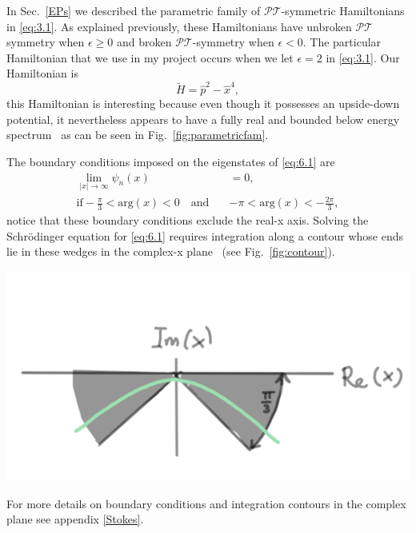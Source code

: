 \documentclass[12pt, a4paper]{report}
\newenvironment{Figure}
    {\par\medskip\noindent\minipage{\linewidth}}
    {\endminipage\par\medskip}
\newcommand\PT{\(\mathcal{PT}\)}
\begin{document}
In Sec.~\ref{EPs} we described the parametric family of \PT-symmetric Hamiltonians in \ref{eq:3.1}. As explained previously, these Hamiltonians have unbroken \PT\:symmetry when $\epsilon \geq 0$ and broken \PT-symmetry when $\epsilon < 0$. The particular Hamiltonian that we use in my project occurs when we let $\epsilon = 2$ in \ref{eq:3.1}. Our Hamiltonian is 
\begin{equation}\label{eq:6.1}
\tilde{H} = \hat{p}^2 - \hat{x}^{4},
\end{equation}
this Hamiltonian is interesting because even though it possesses an upside-down potential, it nevertheless appears to have a fully real and bounded below energy spectrum~\cite{UpsideDownPotentials} as can be seen in Fig.~\ref{fig:parametricfam}. 

The boundary conditions imposed on the eigenstates of \ref{eq:6.1} are
\begin{align}\label{eq:6.2}
\lim_{|x|\rightarrow \infty} \psi_n(x) &= 0, \nonumber\\
\mathrm{if}-\frac{\pi}{3} < \mathrm{arg}(x) < 0 \quad\mathrm{and}\quad&-\pi < \mathrm{arg}(x) < -\frac{2\pi}{3},
\end{align}
notice that these boundary conditions exclude the real-x axis. Solving the Schr\"{o}dinger equation for \ref{eq:6.1} requires integration along a contour whose ends lie in these wedges in the complex-x plane~\cite{UpsideDownPotentials} (see Fig.~\ref{fig:contour}).
\begin{Figure}
\centering
\includegraphics[width=.6\linewidth]{contour.pdf}
\label{fig:contour}
\end{Figure}

For more details on boundary conditions and integration contours in the complex plane see appendix \ref{Stokes}.
\end{document}
